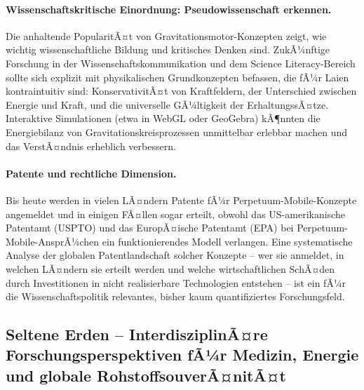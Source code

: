 ﻿\documentclass[12pt, a4paper]{report}
\theoremstyle{definition}
\theoremstyle{remark}
\begin{document}
\paragraph{Wissenschaftskritische Einordnung: Pseudowissenschaft erkennen.}
Die anhaltende PopularitÃ¤t von Gravitationsmotor-Konzepten zeigt, wie wichtig
wissenschaftliche Bildung und kritisches Denken sind. ZukÃ¼nftige Forschung in
der Wissenschaftskommunikation und dem Science Literacy-Bereich sollte sich
explizit mit physikalischen Grundkonzepten befassen, die fÃ¼r Laien kontraintuitiv
sind: KonservativitÃ¤t von Kraftfeldern, der Unterschied zwischen Energie und
Kraft, und die universelle GÃ¼ltigkeit der ErhaltungssÃ¤tze. Interaktive Simulationen
(etwa in WebGL oder GeoGebra) kÃ¶nnten die Energiebilanz von Gravitationskreisprozessen
unmittelbar erlebbar machen und das VerstÃ¤ndnis erheblich verbessern.

\paragraph{Patente und rechtliche Dimension.}
Bis heute werden in vielen LÃ¤ndern Patente fÃ¼r Perpetuum-Mobile-Konzepte angemeldet
und in einigen FÃ¤llen sogar erteilt, obwohl das US-amerikanische Patentamt (USPTO)
und das EuropÃ¤ische Patentamt (EPA) bei Perpetuum-Mobile-AnsprÃ¼chen ein
funktionierendes Modell verlangen. Eine systematische Analyse der globalen
Patentlandschaft solcher Konzepte -- wer sie anmeldet, in welchen LÃ¤ndern sie
erteilt werden und welche wirtschaftlichen SchÃ¤den durch Investitionen in
nicht realisierbare Technologien entstehen -- ist ein fÃ¼r die Wissenschaftspolitik
relevantes, bisher kaum quantifiziertes Forschungsfeld.

\subsection{Seltene Erden -- InterdisziplinÃ¤re Forschungsperspektiven
               fÃ¼r Medizin, Energie und globale RohstoffsouverÃ¤nitÃ¤t}
\label{ssec:ausblick_seltene_erden}
\end{document}

